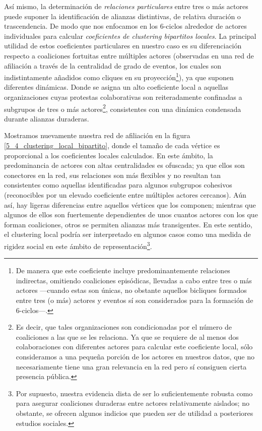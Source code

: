 \documentclass[letterpaper, 11pt]{book}
\theoremstyle{definition}
\theoremstyle{remark}
\begin{document}
Así mismo, la determinación de \emph{relaciones particulares} entre tres o más actores puede suponer la identificación de alianzas distintivas, de relativa duración o trascendencia. 
De modo que nos enfocamos en los 6-ciclos alrededor de actores individuales para calcular \emph{coeficientes de clustering bipartitos locales}. 
La principal utilidad de estos coeficientes particulares en nuestro caso es su diferenciación respecto a coaliciones fortuitas entre múltiples actores (observadas en una red de afiliación a través de la centralidad de grado de eventos, los cuales son indistintamente añadidos como cliques en su proyección\footnote{
    De manera que este coeficiente incluye predominantemente relaciones indirectas, omitiendo coaliciones episódicas, llevadas a cabo entre tres o más actores ---cuando estas son únicas, no obstante aquellos bicliques formados entre tres (o más) actores y eventos sí son considerados para la formación de 6-ciclos---.
}), ya que suponen diferentes dinámicas. 
Donde se asigna un alto coeficiente local a aquellas organizaciones cuyas protestas colaborativas son reiteradamente confinadas a subgrupos de tres o más actores\footnote{
    Es decir, que tales organizaciones son condicionadas por el número de coaliciones a las que se les relaciona. 
    Ya que se requiere de al menos dos colaboraciones con diferentes actores para calcular este coeficiente local, sólo consideramos a una pequeña porción de los actores en nuestros datos, que no necesariamente tiene una gran relevancia en la red pero sí consiguen cierta presencia pública.
}, 
consistentes con una dinámica condensada durante alianzas duraderas. 


Mostramos nuevamente nuestra red de afiliación en la figura \ref{5_4_clustering_local_bipartito}, donde el tamaño de cada vértice es proporcional a los coeficientes locales calculados. 
En este ámbito, la predominancia de actores con altas centralidades es ofuscada; ya que ellos son conectores en la red, sus relaciones son más flexibles y no resultan tan consistentes como aquellas identificadas para algunos subgrupos cohesivos (reconocibles por un elevado coeficiente entre múltiples actores cercanos). 
Aún así, hay ligeras diferencias entre aquellos vértices que los componen; mientras que algunos de ellos son fuertemente dependientes de unos cuantos actores con los que forman coaliciones, otros se permiten alianzas más transigentes. 
En este sentido, el clustering local podría ser interpretado en algunos casos como una medida de rigidez social en este ámbito de representación\footnote{
    Por supuesto, nuestra evidencia dista de ser lo suficientemente robusta como para asegurar coaliciones duraderas entre actores relativamente aislados; no obstante, se ofrecen algunos indicios que pueden ser de utilidad a posteriores estudios sociales. 
}. 
\end{document}

